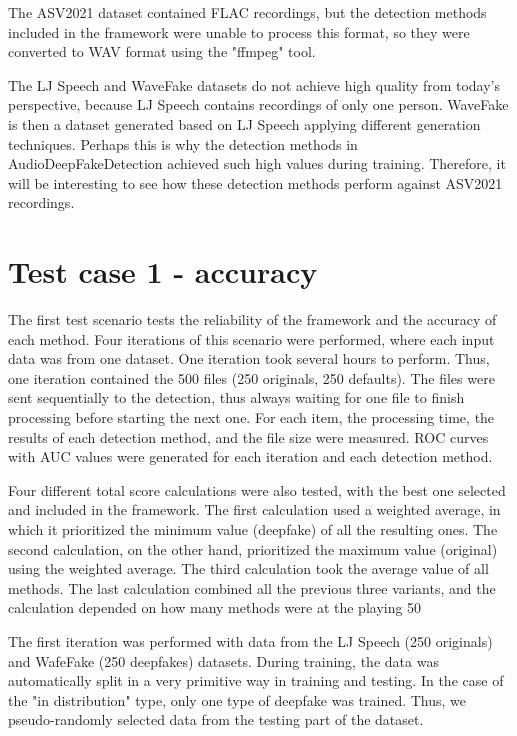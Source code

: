 The ASV2021 dataset contained FLAC recordings, but the detection methods included in the framework were unable to process this format, so they were converted to WAV format using the "ffmpeg" tool.

The LJ Speech and WaveFake datasets do not achieve high quality from today's perspective, because LJ Speech contains recordings of only one person. WaveFake is then a dataset generated based on LJ Speech applying different generation techniques. Perhaps this is why the detection methods in AudioDeepFakeDetection achieved such high values during training. Therefore, it will be interesting to see how these detection methods perform against ASV2021 recordings.

\section{Test case 1 - accuracy}

The first test scenario tests the reliability of the framework and the accuracy of each method. Four iterations of this scenario were performed, where each input data was from one dataset. One iteration took several hours to perform. Thus, one iteration contained the 500 files (250 originals, 250 defaults). The files were sent sequentially to the detection, thus always waiting for one file to finish processing before starting the next one. For each item, the processing time, the results of each detection method, and the file size were measured. ROC curves with AUC values were generated for each iteration and each detection method.

Four different total score calculations were also tested, with the best one selected and included in the framework. The first calculation used a weighted average, in which it prioritized the minimum value (deepfake) of all the resulting ones. The second calculation, on the other hand, prioritized the maximum value (original) using the weighted average. The third calculation took the average value of all methods. The last calculation combined all the previous three variants, and the calculation depended on how many methods were at the playing 50 %

The first iteration was performed with data from the LJ Speech (250 originals) and WafeFake (250 deepfakes) datasets. During training, the data was automatically split in a very primitive way in training and testing. In the case of the "in distribution" type, only one type of deepfake was trained. Thus, we pseudo-randomly selected data from the testing part of the dataset.


